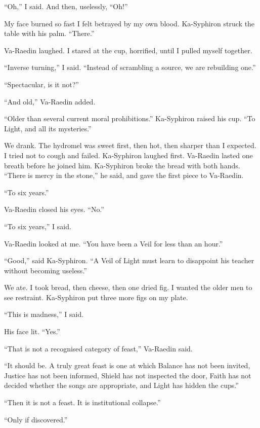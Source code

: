 ``Oh,'' I said. And then, uselessly, ``Oh!''\par

My face burned so fast I felt betrayed by my own blood. Ka-Syphiron struck the table with his palm. ``There.''\par

Va-Raedin laughed. I stared at the cup, horrified, until I pulled myself together.\par

``Inverse turning,'' I said. ``Instead of scrambling a source, we are rebuilding one.''\par
``Spectacular, is it not?''\par
``And old,'' Va-Raedin added.\par
``Older than several current moral prohibitions.'' Ka-Syphiron raised his cup. ``To Light, and all its mysteries.''\par

We drank. The hydromel was sweet first, then hot, then sharper than I expected. I tried not to cough and failed. Ka-Syphiron laughed first. Va-Raedin lasted one breath before he joined him. Ka-Syphiron broke the bread with both hands. ``There is mercy in the stone,'' he said, and gave the first piece to Va-Raedin.\par

``To six years.''\par
Va-Raedin closed his eyes. ``No.''\par
``To six years,'' I said.\par
Va-Raedin looked at me. ``You have been a Veil for less than an hour.''\par
``Good,'' said Ka-Syphiron. ``A Veil of Light must learn to disappoint his teacher without becoming useless.''\par

We ate. I took bread, then cheese, then one dried fig. I wanted the older men to see restraint. Ka-Syphiron put three more figs on my plate.\par
``This is madness,'' I said.\par
His face lit. ``Yes.''\par
``That is not a recognised category of feast,'' Va-Raedin said.\par
``It should be. A truly great feast is one at which Balance has not been invited, Justice has not been informed, Shield has not inspected the door, Faith has not decided whether the songs are appropriate, and Light has hidden the cups.''\par
``Then it is not a feast. It is institutional collapse.''\par
``Only if discovered.''\par

